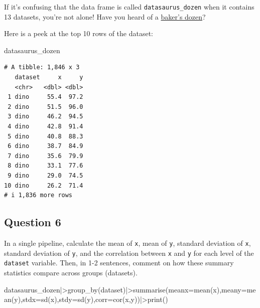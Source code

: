 \documentclass[
  letterpaper,
  DIV=11,
  numbers=noendperiod]{scrartcl}
\newenvironment{Shaded}{\begin{snugshade}}{\end{snugshade}}
\newcommand{\AttributeTok}[1]{\textcolor[rgb]{0.40,0.45,0.13}{#1}}
\newcommand{\FunctionTok}[1]{\textcolor[rgb]{0.28,0.35,0.67}{#1}}
\newcommand{\NormalTok}[1]{\textcolor[rgb]{0.00,0.23,0.31}{#1}}
\newcommand{\SpecialCharTok}[1]{\textcolor[rgb]{0.37,0.37,0.37}{#1}}
\begin{document}
\begin{tcolorbox}[enhanced jigsaw, rightrule=.15mm, breakable, left=2mm, opacitybacktitle=0.6, toptitle=1mm, colbacktitle=quarto-callout-note-color!10!white, toprule=.15mm, title=\textcolor{quarto-callout-note-color}{\faInfo}\hspace{0.5em}{Note}, titlerule=0mm, colframe=quarto-callout-note-color-frame, bottomrule=.15mm, colback=white, opacityback=0, coltitle=black, bottomtitle=1mm, arc=.35mm, leftrule=.75mm]

If it's confusing that the data frame is called
\texttt{datasaurus\_dozen} when it contains 13 datasets, you're not
alone! Have you heard of a
\href{https://www.mentalfloss.com/article/32259/why-bakers-dozen-13}{baker's
dozen}?

\end{tcolorbox}

Here is a peek at the top 10 rows of the dataset:

\begin{Shaded}
\begin{Highlighting}[]
\NormalTok{datasaurus\_dozen}
\end{Highlighting}
\end{Shaded}

\begin{verbatim}
# A tibble: 1,846 x 3
   dataset     x     y
   <chr>   <dbl> <dbl>
 1 dino     55.4  97.2
 2 dino     51.5  96.0
 3 dino     46.2  94.5
 4 dino     42.8  91.4
 5 dino     40.8  88.3
 6 dino     38.7  84.9
 7 dino     35.6  79.9
 8 dino     33.1  77.6
 9 dino     29.0  74.5
10 dino     26.2  71.4
# i 1,836 more rows
\end{verbatim}

\subsection{Question 6}\label{question-6}

In a single pipeline, calculate the mean of \texttt{x}, mean of
\texttt{y}, standard deviation of \texttt{x}, standard deviation of
\texttt{y}, and the correlation between \texttt{x} and \texttt{y} for
each level of the \texttt{dataset} variable. Then, in 1-2 sentences,
comment on how these summary statistics compare across groups
(datasets).

\begin{Shaded}
\begin{Highlighting}[]
\NormalTok{datasaurus\_dozen}\SpecialCharTok{|\textgreater{}}\FunctionTok{group\_by}\NormalTok{(dataset)}\SpecialCharTok{|\textgreater{}}\FunctionTok{summarise}\NormalTok{(}\AttributeTok{meanx=}\FunctionTok{mean}\NormalTok{(x),}\AttributeTok{meany=}\FunctionTok{mean}\NormalTok{(y),}\AttributeTok{stdx=}\FunctionTok{sd}\NormalTok{(x),}\AttributeTok{stdy=}\FunctionTok{sd}\NormalTok{(y),}\AttributeTok{corr=}\FunctionTok{cor}\NormalTok{(x,y))}\SpecialCharTok{|\textgreater{}}\FunctionTok{print}\NormalTok{()}
\end{Highlighting}
\end{Shaded}
\end{document}
